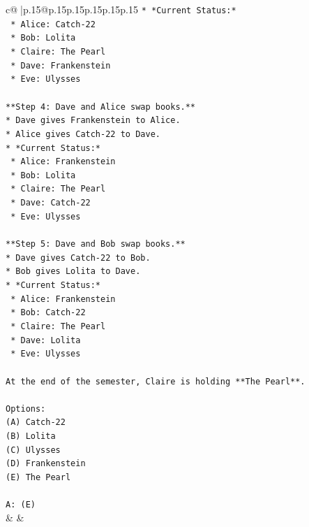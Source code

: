 \documentclass{article}
\begin{document}
{\begin{supertabular}{c@{$\;$}|p{.15\linewidth}@{}p{.15\linewidth}p{.15\linewidth}p{.15\linewidth}p{.15\linewidth}p{.15\linewidth}}
{{{\texttt{*   *Current Status:*} \\
\texttt{    *   Alice: Catch{-}22} \\
\texttt{    *   Bob: Lolita} \\
\texttt{    *   Claire: The Pearl} \\
\texttt{    *   Dave: Frankenstein} \\
\texttt{    *   Eve: Ulysses} \\
\\ 
\texttt{**Step 4: Dave and Alice swap books.**} \\
\texttt{*   Dave gives Frankenstein to Alice.} \\
\texttt{*   Alice gives Catch{-}22 to Dave.} \\
\texttt{*   *Current Status:*} \\
\texttt{    *   Alice: Frankenstein} \\
\texttt{    *   Bob: Lolita} \\
\texttt{    *   Claire: The Pearl} \\
\texttt{    *   Dave: Catch{-}22} \\
\texttt{    *   Eve: Ulysses} \\
\\ 
\texttt{**Step 5: Dave and Bob swap books.**} \\
\texttt{*   Dave gives Catch{-}22 to Bob.} \\
\texttt{*   Bob gives Lolita to Dave.} \\
\texttt{*   *Current Status:*} \\
\texttt{    *   Alice: Frankenstein} \\
\texttt{    *   Bob: Catch{-}22} \\
\texttt{    *   Claire: The Pearl} \\
\texttt{    *   Dave: Lolita} \\
\texttt{    *   Eve: Ulysses} \\
\\ 
\texttt{At the end of the semester, Claire is holding **The Pearl**.} \\
\\ 
\texttt{Options:} \\
\texttt{(A) Catch{-}22} \\
\texttt{(B) Lolita} \\
\texttt{(C) Ulysses} \\
\texttt{(D) Frankenstein} \\
\texttt{(E) The Pearl} \\
\\ 
\texttt{A: (E)} \\
            }
        }
    }
    & & \\ \\


\end{supertabular}}
\end{document}
